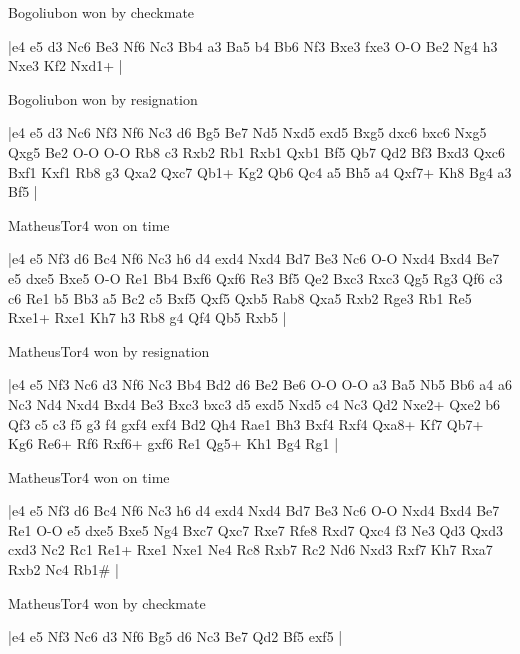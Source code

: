 \showboard

Bogoliubon won by checkmate

\makegametitle
|e4 e5 d3 Nc6 Be3 Nf6 Nc3 Bb4 a3 Ba5 b4 Bb6 Nf3 Bxe3 fxe3 O-O Be2 Ng4 h3 Nxe3 Kf2 Nxd1+  |

\showboard

Bogoliubon won by resignation

\makegametitle
|e4 e5 d3 Nc6 Nf3 Nf6 Nc3 d6 Bg5 Be7 Nd5 Nxd5 exd5 Bxg5 dxc6 bxc6 Nxg5 Qxg5 Be2 O-O O-O Rb8 c3 Rxb2 Rb1 Rxb1 Qxb1 Bf5 Qb7 Qd2 Bf3 Bxd3 Qxc6 Bxf1 Kxf1 Rb8 g3 Qxa2 Qxc7 Qb1+ Kg2 Qb6 Qc4 a5 Bh5 a4 Qxf7+ Kh8 Bg4 a3 Bf5  |

\showboard

MatheusTor4 won on time

\makegametitle
|e4 e5 Nf3 d6 Bc4 Nf6 Nc3 h6 d4 exd4 Nxd4 Bd7 Be3 Nc6 O-O Nxd4 Bxd4 Be7 e5 dxe5 Bxe5 O-O Re1 Bb4 Bxf6 Qxf6 Re3 Bf5 Qe2 Bxc3 Rxc3 Qg5 Rg3 Qf6 c3 c6 Re1 b5 Bb3 a5 Bc2 c5 Bxf5 Qxf5 Qxb5 Rab8 Qxa5 Rxb2 Rge3 Rb1 Re5 Rxe1+ Rxe1 Kh7 h3 Rb8 g4 Qf4 Qb5 Rxb5  |

\showboard

MatheusTor4 won by resignation

\makegametitle
|e4 e5 Nf3 Nc6 d3 Nf6 Nc3 Bb4 Bd2 d6 Be2 Be6 O-O O-O a3 Ba5 Nb5 Bb6 a4 a6 Nc3 Nd4 Nxd4 Bxd4 Be3 Bxc3 bxc3 d5 exd5 Nxd5 c4 Nc3 Qd2 Nxe2+ Qxe2 b6 Qf3 c5 c3 f5 g3 f4 gxf4 exf4 Bd2 Qh4 Rae1 Bh3 Bxf4 Rxf4 Qxa8+ Kf7 Qb7+ Kg6 Re6+ Rf6 Rxf6+ gxf6 Re1 Qg5+ Kh1 Bg4 Rg1  |

\showboard

MatheusTor4 won on time

\makegametitle
|e4 e5 Nf3 d6 Bc4 Nf6 Nc3 h6 d4 exd4 Nxd4 Bd7 Be3 Nc6 O-O Nxd4 Bxd4 Be7 Re1 O-O e5 dxe5 Bxe5 Ng4 Bxc7 Qxc7 Rxe7 Rfe8 Rxd7 Qxc4 f3 Ne3 Qd3 Qxd3 cxd3 Nc2 Rc1 Re1+ Rxe1 Nxe1 Ne4 Rc8 Rxb7 Rc2 Nd6 Nxd3 Rxf7 Kh7 Rxa7 Rxb2 Nc4 Rb1\#  |

\showboard

MatheusTor4 won by checkmate

\makegametitle
|e4 e5 Nf3 Nc6 d3 Nf6 Bg5 d6 Nc3 Be7 Qd2 Bf5 exf5  |

